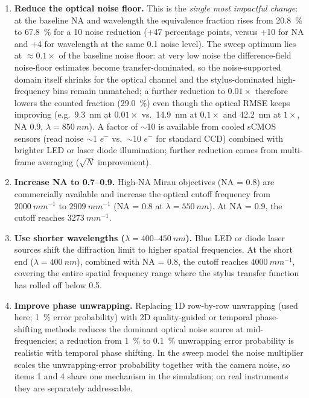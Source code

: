\documentclass[review,12pt]{elsarticle}
\begin{document}
\begin{enumerate}
    \item \textbf{Reduce the optical noise floor.} This is the \emph{single most impactful change}: at the baseline NA and wavelength the equivalence fraction rises from \SI{20.8}{\percent} to \SI{67.8}{\percent} for a \SI{10}{\times} noise reduction (+47 percentage points, versus +10 for NA and +4 for wavelength at the same \SI{0.1}{\times} noise level). The sweep optimum lies at $\approx0.1\times$ of the baseline noise floor: at very low noise the difference-field noise-floor estimates become transfer-dominated, so the noise-supported domain itself shrinks for the optical channel and the stylus-dominated high-frequency bins remain unmatched; a further reduction to $0.01\times$ therefore lowers the counted fraction (\SI{29.0}{\percent}) even though the optical RMSE keeps improving (e.g.\ \SI{9.3}{nm} at $0.01\times$ vs.\ \SI{14.9}{nm} at $0.1\times$ and \SI{42.2}{nm} at $1\times$, NA 0.9, $\lambda=\SI{850}{nm}$). A factor of $\sim$10 is available from cooled sCMOS sensors (read noise $\sim$1 $e^-$ vs.\ $\sim$10 $e^-$ for standard CCD) combined with brighter LED or laser diode illumination; further reduction comes from multi-frame averaging ($\sqrt{N}$ improvement).
    
    \item \textbf{Increase NA to 0.7--0.9.} High-NA Mirau objectives (NA = 0.8) are commercially available and increase the optical cutoff frequency from $\SI{2000}{mm^{-1}}$ to $\SI{2909}{mm^{-1}}$ (NA = 0.8 at $\lambda = \SI{550}{nm}$). At NA = 0.9, the cutoff reaches $\SI{3273}{mm^{-1}}$.
    
    \item \textbf{Use shorter wavelengths ($\lambda = 400$--$\SI{450}{nm}$).} Blue LED or diode laser sources shift the diffraction limit to higher spatial frequencies. At the short end ($\lambda = \SI{400}{nm}$), combined with NA = 0.8, the cutoff reaches $\SI{4000}{mm^{-1}}$, covering the entire spatial frequency range where the stylus transfer function has rolled off below 0.5.
    
    \item \textbf{Improve phase unwrapping.} Replacing 1D row-by-row unwrapping (used here; \SI{1}{\percent} error probability) with 2D quality-guided or temporal phase-shifting methods reduces the dominant optical noise source at mid-frequencies; a reduction from \SI{1}{\percent} to \SI{0.1}{\percent} unwrapping error probability is realistic with temporal phase shifting. In the sweep model the noise multiplier scales the unwrapping-error probability together with the camera noise, so items 1 and 4 share one mechanism in the simulation; on real instruments they are separately addressable.
\end{enumerate}
\end{document}
